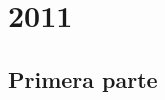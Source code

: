 \chapter{2011}
\label{cha:2011}

\section{Primera parte}
\label{sec:primera-parte}

\begin{Problema}{1}
  
\end{Problema}

\begin{Solucion}
  
\end{Solucion}

\begin{Problema}{2}
  
\end{Problema}

\begin{Solucion}
  
\end{Solucion}

\begin{Problema}{3}
  
\end{Problema}

\begin{Solucion}
  
\end{Solucion}

\begin{Problema}{4}
  
\end{Problema}

\begin{Solucion}
  
\end{Solucion}

\begin{Problema}{5}
  
\end{Problema}

\begin{Solucion}
  
\end{Solucion}

\begin{Problema}{6}
  
\end{Problema}

